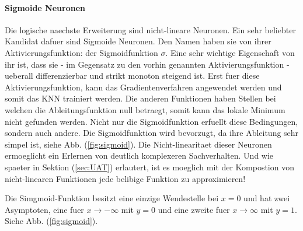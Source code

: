 \documentclass[../main]{subfiles}
\begin{document}
\paragraph{Sigmoide Neuronen}
Die logische naechste Erweiterung sind nicht-lineare Neuronen.
Ein sehr beliebter Kandidat dafuer sind Sigmoide Neuronen.
Den Namen haben sie von ihrer Aktivierungsfunktion: der Sigmoidfunktion $\sigma$.
Eine sehr wichtige Eigenschaft von ihr ist, dass sie - im Gegensatz zu den vorhin
genannten Aktivierungsfunktion - ueberall differenzierbar und strikt monoton
steigend ist. Erst fuer diese Aktivierungsfunktion, kann das Gradientenverfahren
angewendet werden und somit das KNN trainiert werden. Die anderen
Funktionen haben Stellen bei welchen die Ableitungsfunktion null
betraegt, somit kann das lokale Minimum nicht gefunden werden.
Nicht nur die Sigmoidfunktion erfuellt diese Bedingungen, sondern auch andere. Die Sigmoidfunktion wird
bevorzugt, da ihre Ableitung sehr simpel ist, siehe Abb. (\ref{fig:sigmoid}).
Die Nicht-linearitaet dieser Neuronen ermoeglicht ein Erlernen von deutlich komplexeren Sachverhalten.
Und wie spaeter in Sektion (\ref{sec:UAT}) erlautert, ist es moeglich mit der Kompostion von nicht-linearen
Funktionen jede belibige Funktion zu approximieren!
\par\medskip
Die Simgmoid-Funktion besitzt eine einzige Wendestelle bei $x=0$ und hat zwei Asymptoten, eine fuer $x \to -\infty$ mit $y=0$
und eine zweite fuer $x \to\infty$ mit $y=1$. Siehe Abb. (\ref{fig:sigmoid}).
\end{document}
